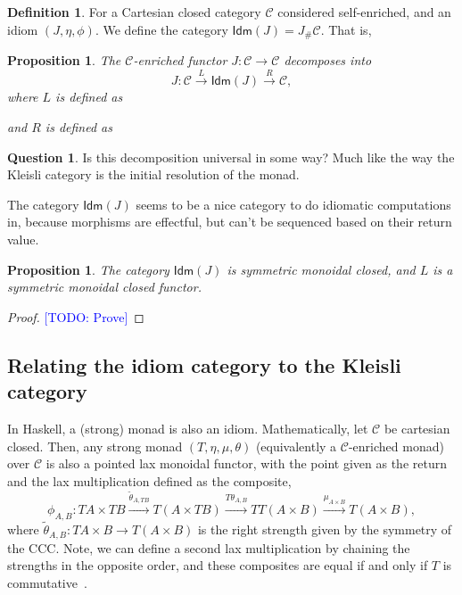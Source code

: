 \documentclass{article}
\newtheorem{prop}[thm]{Proposition}
\theoremstyle{definition}
\newtheorem{defn}[thm]{Definition}
\newtheorem{question}[thm]{Question}
\theoremstyle{remark}
\newcommand{\todo}[1]{\textcolor{blue}{[TODO: #1]}}
\newcommand{\CCat}{\mathcal{C}}
\newcommand{\ob}[1]{{|#1|}}
\newcommand{\mult}{\phi}
\newcommand{\unit}{\eta}
\newcommand{\Idm}[1]{\mathsf{Idm}(#1)}
\begin{document}
\begin{defn}
  For a Cartesian closed category $\CCat$ considered self-enriched, and an idiom $(J, \unit, \mult)$.
  We define the category $\Idm J = J_\#\CCat$. That is,
\end{defn}

\begin{prop}
  The $\CCat$-enriched functor $J: \CCat \to \CCat$ decomposes into
  \[
    J: \CCat \xrightarrow{L} \Idm J \xrightarrow{R} \CCat,
  \]
  where $L$ is defined as
  and $R$ is defined as
\end{prop}

\begin{question}
  Is this decomposition universal in some way? Much like the way the Kleisli category is the initial resolution of the monad.
\end{question}

The category $\Idm J$ seems to be a nice category to do idiomatic computations in, because morphisms are effectful, but can't be sequenced based on their return value.

\begin{prop}
  The category $\Idm J$ is symmetric monoidal closed, and $L$ is a symmetric monoidal closed functor.
\end{prop}

\begin{proof}
  \todo{Prove}
\end{proof}

\subsection{Relating the idiom category to the Kleisli category}

In Haskell, a (strong) monad is also an idiom. Mathematically, let $\CCat$ be cartesian closed.
Then, any strong monad $(T, \eta, \mu, \theta)$ (equivalently a $\CCat$-enriched monad) over $\CCat$ is also a pointed lax monoidal functor,
with the point given as the return and the lax multiplication defined as the composite,
\[
  \phi_{A,B}: TA \times TB \xrightarrow{\tilde\theta_{A,TB}} T(A \times TB) \xrightarrow{T\theta_{A,B}} TT(A \times B) \xrightarrow{\mu_{A\times B}} T(A\times B),
\]
where $\tilde\theta_{A,B} : TA \times B \to T(A\times B)$ is the right strength given by the symmetry of the CCC.
Note, we can define a second lax multiplication by chaining the strengths in the opposite order,
and these composites are equal if and only if $T$ is commutative~\cite{kock-strong-functors}.
\end{document}
